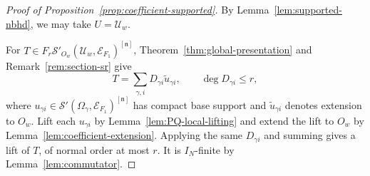 \documentclass[a4paper,12pt]{amsart}
\numberwithin{equation}{section}
\theoremstyle{definition}
\theoremstyle{remark}
\newcommand{\fn}{\mathfrak n}
\newcommand{\IN}{I_N}
\newcommand{\mcU}{\mathcal U}
\newcommand{\mcS}{\mathcal S}
\newcommand{\mcE}{\mathcal E}
\begin{document}
\begin{proof}[Proof of Proposition~\ref{prop:coefficient-supported}]
By Lemma~\ref{lem:supported-nbhd}, we may take $U=\mcU_w$.

For $T\in F_r\mcS'_{O_w}(\mcU_w,\mcE_{F_1})^{[\fn]}$, Theorem~\ref{thm:global-presentation} and Remark~\ref{rem:section-sr} give
\[
 T=\sum_{\gamma,i}D_{\gamma i}\widetilde u_{\gamma i},\qquad
 \deg D_{\gamma i}\leq r,
\]
where $u_{\gamma i}\in\mcS'(\Omega_\gamma,\mcE_{F_1})^{[\fn]}$ has compact base support and $\widetilde u_{\gamma i}$ denotes extension to $O_w$. Lift each $u_{\gamma i}$ by Lemma~\ref{lem:PQ-local-lifting} and extend the lift to $O_w$ by Lemma~\ref{lem:coefficient-extension}. Applying the same $D_{\gamma i}$ and summing gives a lift of $T$, of normal order at most $r$. It is $\IN$-finite by Lemma~\ref{lem:commutator}.
\end{proof}
\end{document}
